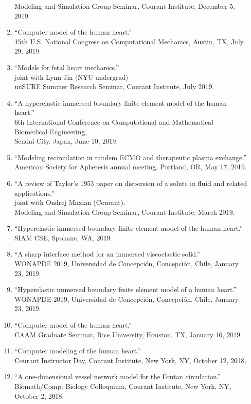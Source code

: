 \documentclass{article} %
\begin{document}
\begin{enumerate}
Modeling and Simulation Group Seminar, Courant Institute, December 5, 2019.
\item ``Computer model of the human heart.'' \\
15th U.S. National Congress on Computational Mechanics, Austin, TX, July 29, 2019. 
\item ``Models for fetal heart mechanics.'' \\
joint with Lynn Jin (NYU undergrad) \\
unSURE Summer Research Seminar, Courant Institute, July 2019.
\item ``A hyperelastic immersed boundary finite element model of the human heart.'' \\
6th International Conference on Computational and Mathematical Biomedical Engineering,\\ Sendai City, Japan, June 10, 2019.
\item ``Modeling recirculation in tandem ECMO and therapeutic plasma exchange.'' \\
American Society for Apheresis annual meeting, Portland, OR, May 17, 2019.
\item ``A review of Taylor's 1953 paper on dispersion of a solute in fluid and related applications.'' \\
joint with Ondrej Maxian (Courant). \\
Modeling and Simulation Group Seminar, Courant Institute, March 2019.
\item ``Hyperelastic immersed boundary finite element model of the human heart.'' \\
SIAM CSE, Spokane, WA, 2019.
\item ``A sharp interface method for an immersed viscoelastic solid.'' \\
WONAPDE 2019, Universidad de Concepci\'on, Concepci\'on, Chile, January 23, 2019.
\item ``Hyperelastic immersed boundary finite element model of a human heart.'' \\
WONAPDE 2019, Universidad de Concepci\'on, Concepci\'on, Chile, January 23, 2019.
\item ``Computer model of the human heart.'' \\
CAAM Graduate Seminar, Rice University, Houston, TX, January 16, 2019.
\item ``Computer modeling of the human heart.'' \\
Courant Instructor Day, Courant Institute, New York, NY, October 12, 2018.
\item ``A one-dimensional vessel network model for the Fontan circulation.'' \\Biomath/Comp. Biology Colloquium, Courant Institute, New York, NY, October 2, 2018.

\end{enumerate}
\end{document}
